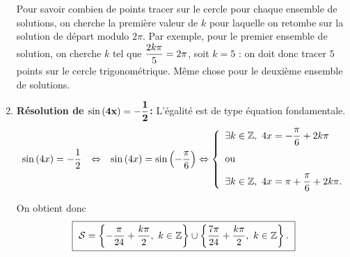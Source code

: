 \documentclass[a4paper, 11pt]{article}
\begin{document}
\begin{correction}
\begin{enumerate}
Pour savoir combien de points tracer sur le cercle pour chaque ensemble de solutions, on cherche la premi\`ere valeur de $k$ pour laquelle on retombe sur la solution de d\'epart modulo $2\pi$. Par exemple, pour le premier ensemble de solution, on cherche $k$ tel que $\displaystyle \frac{2k\pi}{5} = 2\pi$, soit $k=5$ : on doit donc tracer $5$ points sur le cercle trigonom\'etrique. M\^eme chose pour le deuxi\`eme ensemble de solutions.
\item  \textbf{R\'esolution de $\mathbf{\sin{(4x)}=-\displaystyle\frac{1}{2}}$:}
L'\'egalit\'e est de type \'equation fondamentale.
$$\begin{array}{lll}
\sin{(4x)}=-\ddp\frac{1}{2}&\Leftrightarrow &\sin{(4x)}= \sin{\left(-\ddp\frac{\pi}{6}\right)}
\Leftrightarrow  \left\lbrace\begin{array}{l}
\exists k\in\Z,\ 4x=-\ddp\frac{\pi}{6}+2k\pi\vsec\\
\hbox{ou}\vsec\\
\exists k\in\Z,\ 4x=\pi+\ddp\frac{\pi}{6}+2k\pi.
\end{array}\right.
\end{array}$$
\begin{minipage}[c]{0.45\linewidth}
On obtient donc
\begin{equation*}
\fbox{
$\mathcal{S}=\left\lbrace -\ddp\frac{\pi}{24}+\frac{k\pi}{2},\ k\in\Z\right\rbrace\cup\left\lbrace \ddp\frac{7\pi}{24}+\frac{k\pi}{2},\ k\in\Z\right\rbrace.$
}
\end{equation*}
\end{minipage}
\quad

\begin{center}
\end{center}


\end{enumerate}
\end{correction}
\end{document}
